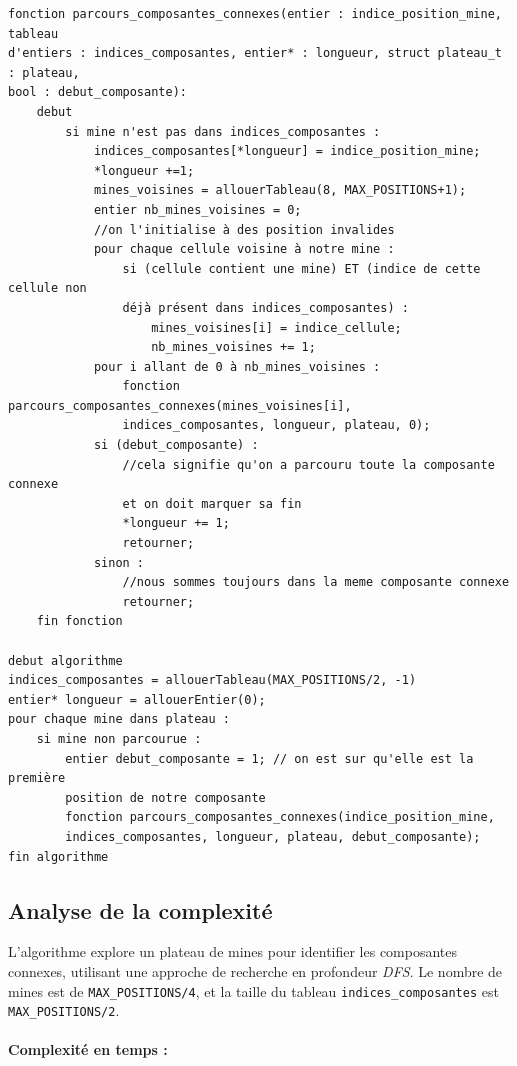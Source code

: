 \documentclass[a4paper,12pt]{report}
\begin{document}
\begin{verbatim}
fonction parcours_composantes_connexes(entier : indice_position_mine, tableau 
d'entiers : indices_composantes, entier* : longueur, struct plateau_t : plateau, 
bool : debut_composante):
    debut
        si mine n'est pas dans indices_composantes :
            indices_composantes[*longueur] = indice_position_mine;
            *longueur +=1;
            mines_voisines = allouerTableau(8, MAX_POSITIONS+1);
            entier nb_mines_voisines = 0;
            //on l'initialise à des position invalides
            pour chaque cellule voisine à notre mine :
                si (cellule contient une mine) ET (indice de cette cellule non 
                déjà présent dans indices_composantes) :
                    mines_voisines[i] = indice_cellule;
                    nb_mines_voisines += 1;          
            pour i allant de 0 à nb_mines_voisines :
                fonction parcours_composantes_connexes(mines_voisines[i], 
                indices_composantes, longueur, plateau, 0);
            si (debut_composante) :
                //cela signifie qu'on a parcouru toute la composante connexe
                et on doit marquer sa fin
                *longueur += 1;
                retourner;
            sinon :
                //nous sommes toujours dans la meme composante connexe
                retourner;
    fin fonction

debut algorithme
indices_composantes = allouerTableau(MAX_POSITIONS/2, -1)
entier* longueur = allouerEntier(0);
pour chaque mine dans plateau :
    si mine non parcourue :
        entier debut_composante = 1; // on est sur qu'elle est la première
        position de notre composante
        fonction parcours_composantes_connexes(indice_position_mine, 
        indices_composantes, longueur, plateau, debut_composante);
fin algorithme
\end{verbatim}

\subsection{Analyse de la complexité}

L'algorithme explore un plateau de mines pour identifier les composantes connexes, utilisant une approche de recherche en profondeur \textit{DFS}. Le nombre de 
mines est de \texttt{MAX\_POSITIONS/4}, et la taille du tableau \texttt{indices\_composantes} est \texttt{MAX\_POSITIONS/2}.

\paragraph{Complexité en temps :}
\end{document}
